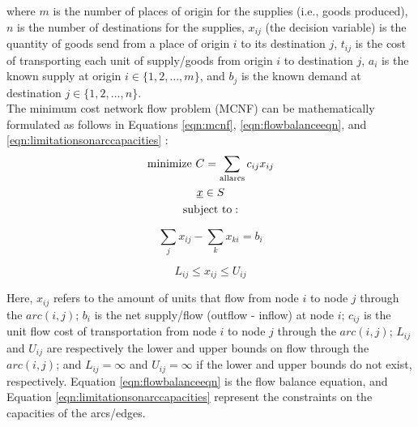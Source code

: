 \documentclass[letter,12pt]{article}
\begin{document}
where $m$ is the number of places of origin for the supplies (i.e., goods produced), $n$ is the number of destinations for the supplies, $x_{ij}$ (the decision variable) is the quantity of goods send from a place of origin $i$ to its destination $j$, $t_{ij}$ is the cost of transporting each unit of supply/goods from origin $i$ to destination $j$, $a_{i}$ is the known supply at origin $i \in \{1, 2, \dots, m\}$, and $b_{j}$ is the known demand at destination $j \in \{1, 2, \dots, n\}$. \\

The minimum cost network flow problem (MCNF) can be mathematically formulated as follows in Equations \ref{eqn:mcnf}, \ref{eqn:flowbalanceeqn}, and \ref{eqn:limitationsonarccapacities} \cite[\S8.5, pp. 448--449; Summary, pp. 471--472]{Winston1995}:
\begin{eqnarray}
\label{eqn:mcnf}
	\begin{gathered}[b]
	{\rm minimize}\ C = \displaystyle\sum_{\rm all arcs} c_{ij}x_{ij} \\
	\underline{x} \in S \\
	{\rm subject\ to:}
	\end{gathered}
\end{eqnarray}

\begin{equation}
\label{eqn:flowbalanceeqn}
\displaystyle\sum_{j} x_{ij} - \displaystyle\sum_{k} x_{ki} = b_{i}
\end{equation}

\begin{equation}
\label{eqn:limitationsonarccapacities}
L_{ij} \leq x_{ij} \leq U_{ij}
\end{equation}

Here, $x_{ij}$ refers to the amount of units that flow from node $i$ to node $j$ through the $arc(i,j)$; $b_{i}$ is the net supply/flow (outflow - inflow) at node $i$; $c_{ij}$ is the unit flow cost of transportation from node $i$ to node $j$ through the $arc(i,j)$; $L_{ij}$ and $U_{ij}$ are respectively the lower and upper bounds on flow through the $arc(i,j)$; and $L_{ij} = \infty$ and $U_{ij} = \infty$ if the lower and upper bounds do not exist, respectively. Equation \ref{eqn:flowbalanceeqn} is the flow balance equation, and Equation \ref{eqn:limitationsonarccapacities} represent the constraints on the capacities of the arcs/edges. \\
\end{document}
